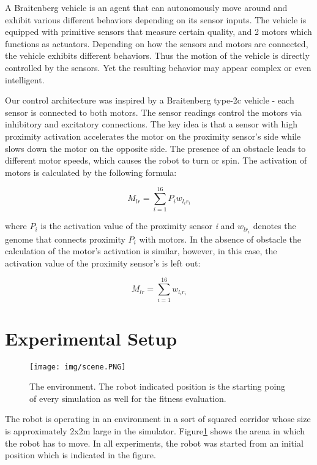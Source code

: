 \documentclass[format=acmsmall, review=false, screen=true]{acmart}
\begin{document}
A Braitenberg vehicle \cite{braitenberg1986vehicles} is an agent that can autonomously move around and exhibit various different behaviors depending on its sensor inputs. The vehicle is equipped with primitive sensors that measure certain quality, and 2 motors which functions as actuators. Depending on how the sensors and motors are connected, the vehicle exhibits different behaviors. Thus the motion of the vehicle is directly controlled by the sensors. Yet the resulting behavior may appear complex or even intelligent.

Our control architecture was inspired by a Braitenberg type-2c vehicle - each sensor is connected to both motors. The sensor readings control the motors via inhibitory and excitatory connections. The key idea is that a sensor with high proximity activation accelerates the motor on the proximity sensor's side while slows down the motor on the opposite side. The presence of an obstacle leads to different motor speeds, which causes the robot to turn or spin. The activation of motors is calculated by the following formula:

\[ M_{lr} = \sum_{i=1}^{16} P_{i} w_{l_i r_i} \]

where \(P_{i}\) is the activation value of the proximity sensor \emph{i} and \(w_{lr_i}\) denotes the genome that connects proximity \(P_{i}\) with motors. In the absence of obstacle the calculation of the motor's activation is similar, however, in this case, the activation value of the proximity sensor's is left out:

\[ M_{lr} = \sum_{i=1}^{16} w_{l_i r_i} \]

\section{Experimental Setup}

\begin{figure}[H]
  \texttt{[image: img/scene.PNG]}
  \caption{The environment. The robot indicated position is the starting poing of every simulation as well for the fitness evaluation.}
  \label{fig:arena-scene}
\end{figure}

The robot is operating in an environment in a sort of squared corridor whose size is approximately 2x2m large in the simulator. Figure\ref{fig:arena-scene} shows the arena in which the robot has to move. In all experiments, the robot was started from an initial position which is indicated in the figure.
\end{document}
